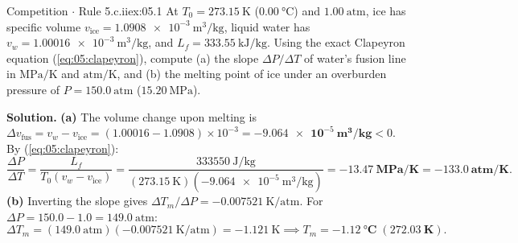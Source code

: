 \begin{workedexample}{Competition $\cdot$ Rule 5.c.ii}{ex:05.1}
At $T_0 = \SI{273.15}{\kelvin}$ ($\SI{0.00}{\celsius}$) and $\SI{1.00}{\text{atm}}$, ice has specific volume $v_{\mathrm{ice}} = \SI{1.0908e-3}{\cubic\meter\per\kilogram}$, liquid water has $v_w = \SI{1.00016e-3}{\cubic\meter\per\kilogram}$, and $L_f = \SI{333.55}{\kilo\joule\per\kilogram}$. Using the exact Clapeyron equation (\ref{eq:05:clapeyron}), compute (a) the slope $\Delta P/\Delta T$ of water's fusion line in $\si{\mega\pascal\per\kelvin}$ and $\si{\text{atm}\per\kelvin}$, and (b) the melting point of ice under an overburden pressure of $P = \SI{150.0}{\text{atm}}$ ($\SI{15.20}{\mega\pascal}$).

\textbf{Solution.}
\textbf{(a)} The volume change upon melting is $\Delta v_{\mathrm{fus}} = v_w - v_{\mathrm{ice}} = (1.00016 - 1.0908)\times 10^{-3} = \mathbf{-\SI{9.064e-5}{\cubic\meter\per\kilogram}} < 0$. By (\ref{eq:05:clapeyron}):
\[
  \frac{\Delta P}{\Delta T} = \frac{L_f}{T_0(v_w - v_{\mathrm{ice}})} = \frac{\SI{333550}{\joule\per\kilogram}}{(\SI{273.15}{\kelvin})(-\SI{9.064e-5}{\cubic\meter\per\kilogram})} = \mathbf{-\SI{13.47}{\mega\pascal\per\kelvin} = -\SI{133.0}{\text{atm}\per\kelvin}}.
\]
\textbf{(b)} Inverting the slope gives $\Delta T_m / \Delta P = -\SI{0.007521}{\kelvin\per\text{atm}}$. For $\Delta P = 150.0 - 1.0 = \SI{149.0}{\text{atm}}$:
\[
  \Delta T_m = (\SI{149.0}{\text{atm}})(-\SI{0.007521}{\kelvin\per\text{atm}}) = -\SI{1.121}{\kelvin} \implies T_m = \mathbf{-\SI{1.12}{\celsius}\;(\SI{272.03}{\kelvin})}.
\]
\end{workedexample}


